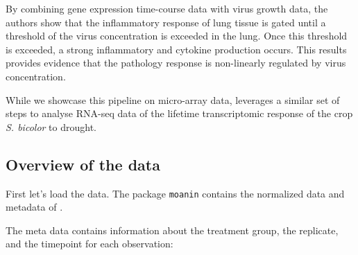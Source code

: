 \documentclass[9pt,a4paper,]{extarticle}
\newenvironment{Shaded}{\begin{snugshade}}{\end{snugshade}}
\newcommand{\CommentTok}[1]{\textcolor[rgb]{0.56,0.35,0.01}{\textit{#1}}}
\newcommand{\KeywordTok}[1]{\textcolor[rgb]{0.13,0.29,0.53}{\textbf{#1}}}
\newcommand{\NormalTok}[1]{#1}
\newcommand{\OperatorTok}[1]{\textcolor[rgb]{0.81,0.36,0.00}{\textbf{#1}}}
\newcommand{\StringTok}[1]{\textcolor[rgb]{0.31,0.60,0.02}{#1}}
\begin{document}
By combining gene expression time-course data with virus growth data, the
authors show that the inflammatory response of lung tissue is gated until a
threshold of the virus concentration is exceeded in the lung. Once this
threshold is exceeded, a strong inflammatory and cytokine production occurs.
This results provides evidence that the pathology response is non-linearly
regulated by virus concentration.

While we showcase this pipeline on micro-array data,
\citep{varoquaux:transcriptomic}
leverages a similar set of steps to analyse RNA-seq data of the lifetime
transcriptomic response of the crop \emph{S. bicolor} to drought.

\hypertarget{overview-of-the-data}{%
\subsection{Overview of the data}\label{overview-of-the-data}}

First let's load the data. The package \texttt{moanin} contains the normalized
data and metadata of \citep{shoemaker:ultrasensitive}.

\begin{Shaded}
\end{Shaded}

The meta data contains information about the treatment group, the replicate,
and the timepoint for each observation:
\end{document}
